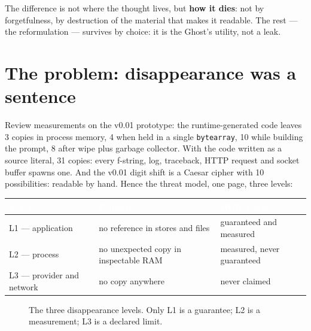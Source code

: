 \documentclass[11pt,a4paper]{article}
\begin{document}
The difference is not where the thought lives, but \textbf{how it dies}: not by
forgetfulness, by destruction of the material that makes it readable. The rest ---
the reformulation --- survives by choice: it is the Ghost's utility, not a leak.

\section{The problem: disappearance was a sentence}
Review measurements on the v0.01 prototype: the runtime-generated code leaves
3 copies in process memory, 4 when held in a single \texttt{bytearray}, 10 while
building the prompt, 8 after wipe plus garbage collector. With the code written as
a source literal, 31 copies: every f-string, log, traceback, HTTP request and
socket buffer spawns one. And the v0.01 digit shift is a Caesar cipher with
10 possibilities: readable by hand. Hence the threat model, one page, three levels:

\begin{center}
\begin{tabular}{lll}
\rowcolor{ghostblue}\textcolor{white}{Level} & \textcolor{white}{Promise} & \textcolor{white}{v0.02 status} \\
\midrule
\rowcolor{palegreen}L1 --- application & no reference in stores and files & guaranteed and measured \\
\rowcolor{paleamber}L2 --- process & no unexpected copy in inspectable RAM & measured, never guaranteed \\
\rowcolor{palered}L3 --- provider and network & no copy anywhere & never claimed \\
\bottomrule
\end{tabular}
\end{center}

\begin{figure}[h]
\centering
{}
\caption{The three disappearance levels. Only L1 is a guarantee; L2 is a measurement; L3 is a declared limit.}
\end{figure}
\end{document}
